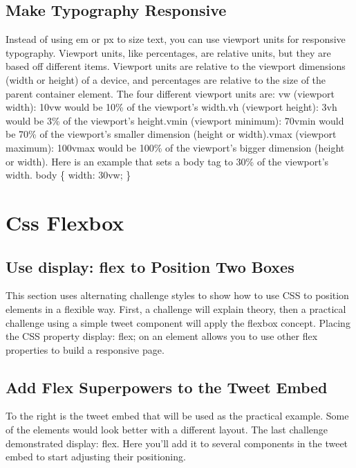 \documentclass{article}%
\begin{document}
\subsection{Make Typography Responsive}%
\label{subsec:MakeTypographyResponsive}%
Instead of using em or px to size text, you can use viewport units for responsive typography. Viewport units, like percentages, are relative units, but they are based off different items. Viewport units are relative to the viewport dimensions (width or height) of a device, and percentages are relative to the size of the parent container element.\newline%
The four different viewport units are:\newline%
vw (viewport width): 10vw would be 10\% of the viewport's width.vh (viewport height): 3vh would be 3\% of the viewport's height.vmin (viewport minimum): 70vmin would be 70\% of the viewport's smaller dimension (height or width).vmax (viewport maximum): 100vmax would be 100\% of the viewport's bigger dimension (height or width).\newline%
Here is an example that sets a body tag to 30\% of the viewport's width.\newline%
body \{ width: 30vw; \}\newline%

%
\newpage%
\section{Css Flexbox}%
\label{sec:CssFlexbox}%
\subsection{Use display: flex to Position Two Boxes}%
\label{subsec:UsedisplayflextoPositionTwoBoxes}%
This section uses alternating challenge styles to show how to use CSS to position elements in a flexible way. First, a challenge will explain theory, then a practical challenge using a simple tweet component will apply the flexbox concept.\newline%
Placing the CSS property display: flex; on an element allows you to use other flex properties to build a responsive page.\newline%

%
\subsection{Add Flex Superpowers to the Tweet Embed}%
\label{subsec:AddFlexSuperpowerstotheTweetEmbed}%
To the right is the tweet embed that will be used as the practical example. Some of the elements would look better with a different layout. The last challenge demonstrated display: flex. Here you'll add it to several components in the tweet embed to start adjusting their positioning.\newline%
\end{document}
